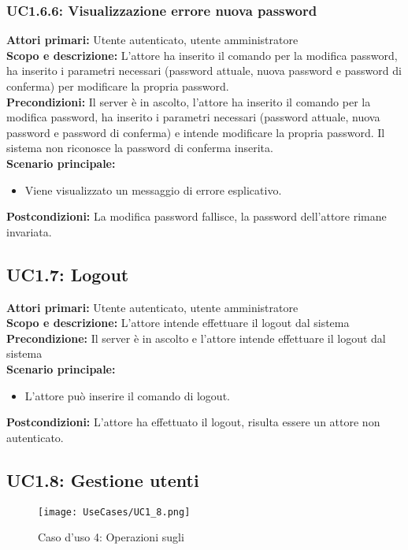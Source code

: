 \documentclass{scalatekids-article}
\begin{document}
\subsubsection{UC1.6.6: Visualizzazione errore nuova password}

\textbf{Attori primari:} Utente autenticato, utente amministratore\\
\textbf{Scopo e descrizione:}
L'attore ha inserito il comando per la modifica password, ha inserito i parametri necessari (password attuale, nuova password e password di conferma) per modificare la propria password.\\
\textbf{Precondizioni:} Il server è in ascolto, l'attore ha inserito il comando per la modifica password, ha inserito i parametri necessari (password attuale, nuova password e password di conferma) e intende modificare la propria password. Il sistema non riconosce la password di conferma inserita.\\
\textbf{Scenario principale:}
\begin{itemize}
\item Viene visualizzato un messaggio di errore esplicativo.
\end{itemize}
\textbf{Postcondizioni:} La modifica password fallisce, la password dell'attore rimane invariata.

\subsection{UC1.7: Logout}

\textbf{Attori primari:} Utente autenticato, utente amministratore\\
\textbf{Scopo e descrizione:} L'attore intende effettuare il logout dal sistema\\
\textbf{Precondizione:} Il server è in ascolto e l'attore intende effettuare il logout dal sistema\\
\textbf{Scenario principale:}
\begin{itemize}
\item L'attore può inserire il comando di logout.
\end{itemize}
\textbf{Postcondizioni:} L'attore ha effettuato il logout, risulta essere un attore non autenticato.

\subsection{UC1.8: Gestione utenti}

\begin{figure}[H]
  \begin{center}
    \texttt{[image: UseCases/UC1\_8.png]}
    \caption{Caso d'uso 4: Operazioni sugli }
  \end{center}
\end{figure}
\end{document}
